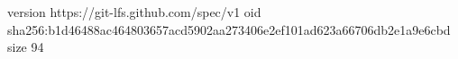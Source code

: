 version https://git-lfs.github.com/spec/v1
oid sha256:b1d46488ac464803657acd5902aa273406e2ef101ad623a66706db2e1a9e6cbd
size 94
